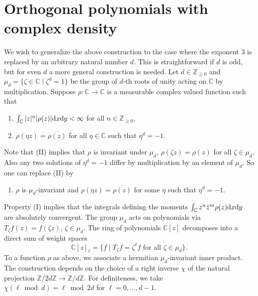 \documentclass[pdftex]{sigma}
\numberwithin{equation}{section}
\theoremstyle{definition}
\begin{document}
\section{Orthogonal polynomials with complex density}\label{s-3}
We wish to generalize the above construction to the case where the exponent 3 is replaced by an arbitrary natural number $d$. This is straightforward if $d$ is odd, but for even $d$ a more general construction is needed. Let $d\in\mathbb Z_{\geq0}$ and $\mu_d=\big\{\zeta\in\mathbb C \mid \zeta^d=1\big\}$ be the group of $d$-th roots of unity acting on $\mathbb C$ by multiplication. Suppose $\rho\colon\mathbb C\to \mathbb C$ is a measurable complex valued function such that
\begin{enumerate}\itemsep=0pt
 \item [(I)] $\int_{\mathbb C}|z|^n|\rho(z)|{\rm d}x{\rm d}y<\infty$ for all $n\in\mathbb Z_{\geq0}$,
 \item [(II)] $\rho(\eta z)=\overline{\rho(z)}$ for all $\eta\in \mathbb C$ such that $\eta^d=-1$.
\end{enumerate}
Note that (II) implies that $\rho$ is invariant under $\mu_d$, $\rho(\zeta z)=\rho(z)$ for all $\zeta\in\mu_d$. Also any two solutions of $\eta^d=-1$ differ by multiplication by an element of $\mu_d$. So one can replace (II) by
\begin{enumerate}\itemsep=0pt
 \item [(II$'$)] $\rho$ is $\mu_d$-invariant and $\rho(\eta z)=\overline{\rho(z)}$ for some $\eta$ such that $\eta^d=-1$.
\end{enumerate}
Property (I) implies that the integrals defining the moments $\int_{\mathbb C} z^n\bar z^m\rho(z){\rm d}x{\rm d}y$ are absolutely convergent. The group $\mu_d$ acts
on polynomials via $T_\zeta f(z)=f(\zeta z)$, $\zeta\in\mu_d$.
The ring of polynomials $\mathbb C[z]$ decomposes into a direct sum
of weight spaces
\[
\mathbb C[z]_\ell=\big\{f \mid T_\zeta f=\zeta^\ell f
\text{ for all $\zeta\in\mu_d$}\big\}.
\]
To a function $\rho$ as above, we associate a hermitian $\mu_d$-invariant inner product. The construction depends on the choice of a right inverse $\chi$ of the natural projection $\mathbb Z/2d\mathbb Z\to\mathbb Z/d\mathbb Z$. For definiteness, we take
$\chi(\ell \bmod{d})=\ell \bmod{2d}$ for $\ell=0,\dots,d-1$.
\end{document}
